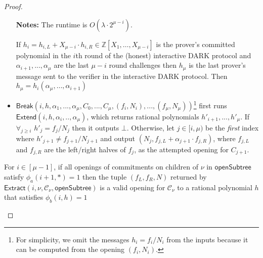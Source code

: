 \begin{proof}
\begin{itemize}
\textbf{Notes:} 
The runtime is $O(\lambda \cdot 2^{\mu - i})$. 

If $h_{i}=h_{i,L} + X_{\mu-i}\cdot  h_{i,R}  \in \mathbb{Z}[X_1,\dots,X_{\mu-i}]$ is the prover's committed polynomial in the $i$th round of the (honest) interactive DARK protocol and $\alpha_{i+1},...,\alpha_\mu$ are the last $\mu - i$ round challenges then $h_\mu$ is the last prover's message sent to the verifier in the interactive DARK protocol. Then $h_\mu=h_i(\alpha_{\mu},\dots,\alpha_{i+1})$

 
 \item $\textsf{Break}(i, h, \alpha_1,...,\alpha_\mu, C_0,...,C_\mu, (f_i, N_i),...,(f_\mu, N_\mu))$\footnote{For simplicity, we omit the messages $h_i = f_i/N_i$ from the inputs because it can be computed from the opening $(f_i, N_i)$.}  first runs $\textsf{Extend}(i, h, \alpha_i,..,\alpha_{\mu})$, which returns rational polynomials $h'_{i+1},...,h'_{\mu}$. If $\forall_{j \geq i}$ $h'_j = f_j/N_j$ then it outputs $\bot$. Otherwise, let $j \in [i, \mu)$ be the \textit{first} index where $h'_{j+1}\neq f_{j+1}/N_{j+1}$ and output $(N_j, f_{j, L} + \alpha_{j+1} \cdot  f_{j, R})$, where $f_{j, L}$ and $f_{j, R}$ are the left/right halves of $f_j$, as the attempted opening for $C_{j+1}$.
\end{itemize}

\begin{subclaim} 
For $i \in [\mu-1]$, if all openings of commitments on children of $\nu$ in $\textsf{openSubtree}$ satisfy $\phi_a(i+1, *)=1$ then the tuple $(f_L, f_R, N)$ returned by $\textsf{Extract}(i, \nu, \mathcal{C}_\nu, \textsf{openSubtree})$ is a valid opening for $\mathcal{C}_\nu$ to a rational polynomial $h$ that satisfies $\phi_b(i, h) = 1$ 
\end{subclaim} 


\end{proof}
